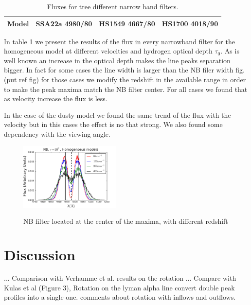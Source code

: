 \documentclass[usenatbib]{mn2e}
\begin{document}
\begin{table}
\begin{center}
\begin{tabular}{cccc}\hline
Model & SSA22a 4980/80   & HS1549 4667/80 & HS1700 4018/90\\
\hline
\end{tabular}
\caption{
Fluxes for tree different narrow band filters.
} 
\label{table:NBfilters}
\end{center}
\end{table}

In table \ref{table:NBfilters} we present the results of the flux in
every  narrowband filter for the homogeneous model at different
velocities and hydrogen  optical depth $\tau_{0}$. As is well known an
increase in the optical depth makes  the line peaks separation
bigger. In fact for some cases the line width is larger  than the NB
filer width fig.(put ref fig) for those cases we modify the redshift
in the available range in order to make the peak maxima match the NB
filter center.  For all cases we found that as velocity increase the
flux is less.  

In the case of the dusty model we found the same trend of the flux
with the velocity  but in this cases the effect is no that strong.  We
also found some dependency with the viewing angle. 

\begin{figure}
  \includegraphics[width=0.45\textwidth]{NB7tDifVHOM.png}
 \label{figure:efvsNeufeld}\caption{NB filter located at the center of
   the maxima, with different redshift}  
\end{figure}

\section{Discussion}
\label{sec:discussion}

... Comparison with Verhamme et al. results on the rotation
... Compare with Kulas et al (Figure 3), Rotation on the lyman alpha
line convert double peak profiles into a single one. comments about
rotation with inflows and outflows.  
\end{document}
